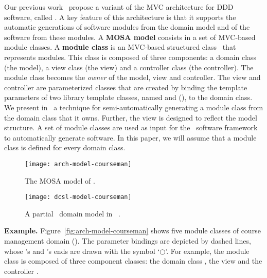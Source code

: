 Our previous work~\cite{le_tree-based_2015, le_generative_2018} propose a variant of the MVC architecture for DDD software, called . A key feature of this architecture is that it supports the automatic generations of software modules from the domain model and of the software from these modules.
%
A \textbf{MOSA model} consists in a set of MVC-based module classes. 
A \textbf{module class} is an MVC-based structured class~\cite{omg_unified_2017} that represents modules. This class is composed of three components: a domain class (the model), a view class (the view) and a controller class (the controller). The module class becomes the \textit{owner} of the model, view and controller. The view and controller are parameterized classes that are created by binding the template parameters of two library template classes, named  and  (\resp), to the domain class.
%
We present in~\cite{le_generative_2018} a technique for semi-automatically generating a module class from the domain class that it owns. Further, the view is designed to reflect the model structure. A set of module classes are used as input for the \jdomainapp~software framework~\cite{le_jdomainapp_2017} to automatically generate software. In this paper, we will assume that a module class is defined for every domain class.


\begin{figure}[th]
	\centering
	\begin{minipage}[b]{0.4\textwidth}
		\texttt{[image: arch-model-courseman]}
		\vspace{0.1cm}\caption{The MOSA model of \courseman.}
		\label{fig:arch-model-courseman}
	\end{minipage}
	\hspace{0.5em}
	\begin{minipage}[b]{0.56\textwidth}
		\texttt{[image: dcsl-model-courseman]}
		\vspace{0.1cm}\caption{A partial \courseman~domain model in \dcsl~\cite{le_domain_2018}.}
		\label{fig:dcsl_courseman}
	\end{minipage}
\end{figure}

%
\noindent \textbf{Example.} Figure~\ref{fig:arch-model-courseman} shows five module classes of course management domain (\courseman). The parameter bindings are depicted by dashed lines, whose 's and 's ends are drawn with the symbol `$\bigcirc$'. 
%
For example, the module class  is composed of three component classes: the domain class , the view  and the controller .


